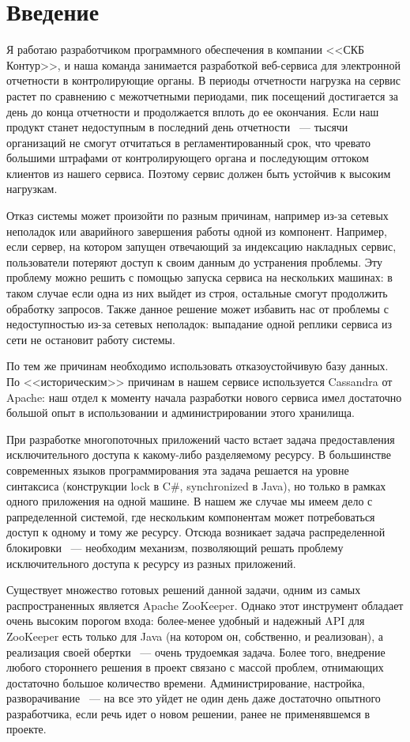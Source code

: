 \section{Введение}

Я работаю разработчиком программного обеспечения в компании <<СКБ Контур>>, и наша команда занимается разработкой веб-сервиса для электронной отчетности в контролирующие органы. В периоды отчетности нагрузка на сервис растет по сравнению с межотчетными периодами, пик посещений достигается за день до конца отчетности и продолжается вплоть до ее окончания. Если наш продукт станет недоступным в последний день отчетности ~--- тысячи организаций не смогут отчитаться в регламентированный срок, что чревато большими штрафами от контролирующего органа и последующим оттоком клиентов из нашего сервиса. Поэтому сервис должен быть устойчив к высоким нагрузкам.

Отказ системы может произойти по разным причинам, например из-за сетевых неполадок или аварийного завершения работы одной из компонент. Например, если сервер, на котором запущен отвечающий за индексацию накладных сервис, пользователи потеряют доступ к своим данным до устранения проблемы. Эту проблему можно решить с помощью запуска сервиса на нескольких машинах: в таком случае если одна из них выйдет из строя, остальные смогут продолжить обработку запросов. Также данное решение может избавить нас от проблемы с недоступностью из-за сетевых неполадок: выпадание одной реплики сервиса из сети не остановит работу системы.

По тем же причинам необходимо использовать отказоустойчивую базу данных. По <<историческим>> причинам в нашем сервисе используется Cassandra от Apache: наш отдел к моменту начала разработки нового сервиса имел достаточно большой опыт в использовании и администрировании этого хранилища.

При разработке многопоточных приложений часто встает задача предоставления исключительного доступа к какому-либо разделяемому ресурсу. В большинстве современных языков программирования эта задача решается на уровне синтаксиса (конструкции lock в C\#, synchronized в Java), но только в рамках одного приложения на одной машине. В нашем же случае мы имеем дело с рапределенной системой, где нескольким компонентам может потребоваться доступ к одному и тому же ресурсу. Отсюда возникает задача распределенной блокировки ~--- необходим механизм, позволяющий решать проблему исключительного доступа к ресурсу из разных приложений.

Существует множество готовых решений данной задачи, одним из самых распространенных является Apache ZooKeeper. Однако этот инструмент обладает очень высоким порогом входа: более-менее удобный и надежный API для ZooKeeper есть только для Java (на котором он, собственно, и реализован), а реализация своей обертки ~--- очень трудоемкая задача. Более того, внедрение любого стороннего решения в проект связано с массой проблем, отнимающих достаточно большое количество времени. Администрирование, настройка, разворачивание ~--- на все это уйдет не один день даже достаточно опытного разработчика, если речь идет о новом решении, ранее не применявшемся в проекте.

